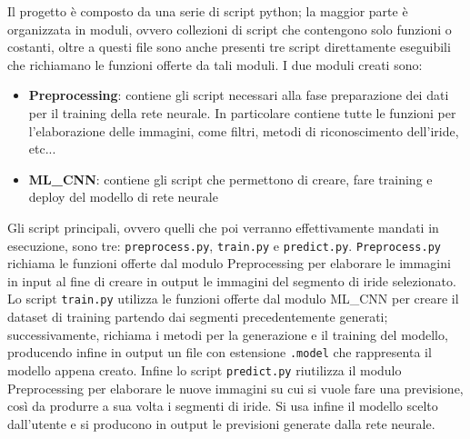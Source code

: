 Il progetto è composto da una serie di script python; la maggior parte è organizzata in moduli, ovvero collezioni di script che contengono solo funzioni o costanti, oltre a questi file sono anche presenti tre script direttamente eseguibili che richiamano le funzioni offerte da tali moduli.
I due moduli creati sono:
\begin{itemize}
  \item \textbf{Preprocessing}: contiene gli script necessari alla fase preparazione dei dati per il training della rete neurale. In particolare contiene tutte le funzioni per l’elaborazione delle immagini, come filtri, metodi di riconoscimento dell’iride, etc...
  \item \textbf{ML\_CNN}:  contiene gli script che permettono di creare, fare training e deploy del modello di rete neurale  
\end{itemize}

Gli script principali, ovvero quelli che poi verranno effettivamente mandati in esecuzione,  sono tre: \texttt{preprocess.py}, \texttt{train.py} e \texttt{predict.py}. \texttt{Preprocess.py} richiama le funzioni offerte dal modulo Preprocessing per elaborare le immagini in input al fine di  creare in output le immagini del segmento di iride selezionato. Lo script \texttt{train.py} utilizza le funzioni offerte dal modulo ML\_CNN per creare il dataset di training partendo dai segmenti precedentemente generati; successivamente, richiama i metodi per la generazione e il training del modello, producendo infine in output un file con estensione \texttt{.model} che rappresenta il modello appena creato. Infine lo script \texttt{predict.py} riutilizza il modulo Preprocessing per elaborare le nuove immagini su cui si vuole fare una previsione, così da produrre a sua volta i segmenti di iride. Si usa infine il modello scelto dall’utente e si producono in output le previsioni  generate dalla rete neurale.
